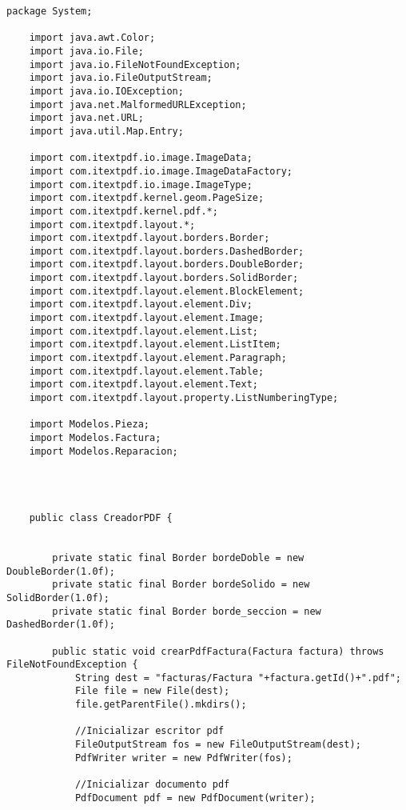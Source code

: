 \begin{lstlisting}[caption=CreadorPDF.java (App Escritorio)]
    package System;

    import java.awt.Color;
    import java.io.File;
    import java.io.FileNotFoundException;
    import java.io.FileOutputStream;
    import java.io.IOException;
    import java.net.MalformedURLException;
    import java.net.URL;
    import java.util.Map.Entry;
    
    import com.itextpdf.io.image.ImageData;
    import com.itextpdf.io.image.ImageDataFactory;
    import com.itextpdf.io.image.ImageType;
    import com.itextpdf.kernel.geom.PageSize;
    import com.itextpdf.kernel.pdf.*;
    import com.itextpdf.layout.*;
    import com.itextpdf.layout.borders.Border;
    import com.itextpdf.layout.borders.DashedBorder;
    import com.itextpdf.layout.borders.DoubleBorder;
    import com.itextpdf.layout.borders.SolidBorder;
    import com.itextpdf.layout.element.BlockElement;
    import com.itextpdf.layout.element.Div;
    import com.itextpdf.layout.element.Image;
    import com.itextpdf.layout.element.List;
    import com.itextpdf.layout.element.ListItem;
    import com.itextpdf.layout.element.Paragraph;
    import com.itextpdf.layout.element.Table;
    import com.itextpdf.layout.element.Text;
    import com.itextpdf.layout.property.ListNumberingType;
    
    import Modelos.Pieza;
    import Modelos.Factura;
    import Modelos.Reparacion;
    
    
    
    
    public class CreadorPDF {
        
        
        private static final Border bordeDoble = new DoubleBorder(1.0f);
        private static final Border bordeSolido = new SolidBorder(1.0f);
        private static final Border borde_seccion = new DashedBorder(1.0f);
        
        public static void crearPdfFactura(Factura factura) throws FileNotFoundException {
            String dest = "facturas/Factura "+factura.getId()+".pdf";
            File file = new File(dest);
            file.getParentFile().mkdirs();
    
            //Inicializar escritor pdf
            FileOutputStream fos = new FileOutputStream(dest);
            PdfWriter writer = new PdfWriter(fos);
            
            //Inicializar documento pdf
            PdfDocument pdf = new PdfDocument(writer);
            

\end{lstlisting}
